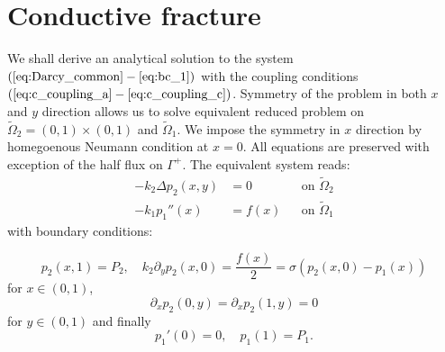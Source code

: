 \documentclass[a4paper,10pt]{article}
\def\Laplace{\Delta}
\def\prtl{\partial} %
\begin{document}
\section{Conductive fracture }
\label{sec:continuous_frac}
We shall derive an analytical solution to the system $(\ref{eq:Darcy_common} - \ref{eq:bc_1})$ with the coupling conditions 
$(\ref{eq:c_coupling_a} - \ref{eq:c_coupling_c})$. Symmetry of the problem in 
both $x$ and $y$ direction allows us to solve equivalent reduced problem on $\widetilde\Omega_2=(0,1)\times(0,1)$ and  
$\widetilde\Omega_1$. We impose the symmetry in $x$ direction by homegoenous Neumann condition at $x=0$. 
All equations are preserved with exception of the half flux on $\Gamma^+$. The equivalent system  reads:
\begin{align}
    \label{eq:cc_darcy_2d}
    -k_2 \Laplace p_2(x,y) &= 0         &&\text{on }\widetilde\Omega_2 \\
    \label{eq:cc_darcy_1d}
    -k_1 p_1''(x) &= f(x)               &&\text{on }\widetilde\Omega_1
\end{align}
with boundary conditions:    

\begin{equation}
    \label{eq:cc_bc_x}
    p_2(x, 1) = P_2, \quad
    k_2\prtl_y p_2(x,0) = \frac{f(x)}{2}
                        = \sigma(p_2(x,0) - p_1(x))
\end{equation}
for  $x\in (0,1)$,
\begin{equation}
    \label{eq:cc_bc_y}
    \prtl_x p_2(0,y) = \prtl_x p_2(1,y) = 0    
\end{equation}
for $y \in (0, 1)$ and finally
\begin{equation}
    \label{eq:cc_bc_1}
    p_1'(0) = 0, \quad  p_1(1) = P_1. 
\end{equation}
\end{document}
